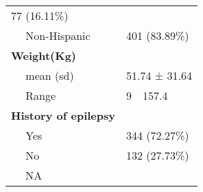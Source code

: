 \documentclass[
]{article}
\begin{document}
\begin{longtable}[]{@{}ll@{}}
\begin{minipage}[t]{0.21\columnwidth}
77 (16.11\%)\strut
\end{minipage}\tabularnewline
\begin{minipage}[t]{0.73\columnwidth}\raggedright
~~ Non-Hispanic\strut
\end{minipage} & \begin{minipage}[t]{0.21\columnwidth}\raggedright
401 (83.89\%)\strut
\end{minipage}\tabularnewline
\begin{minipage}[t]{0.73\columnwidth}\raggedright
\textbf{Weight(Kg)}\strut
\end{minipage} & \begin{minipage}[t]{0.21\columnwidth}\raggedright
~~\strut
\end{minipage}\tabularnewline
\begin{minipage}[t]{0.73\columnwidth}\raggedright
~~ mean (sd)\strut
\end{minipage} & \begin{minipage}[t]{0.21\columnwidth}\raggedright
51.74 ± 31.64\strut
\end{minipage}\tabularnewline
\begin{minipage}[t]{0.73\columnwidth}\raggedright
~~ Range\strut
\end{minipage} & \begin{minipage}[t]{0.21\columnwidth}\raggedright
9~~157.4\strut
\end{minipage}\tabularnewline
\begin{minipage}[t]{0.73\columnwidth}\raggedright
\textbf{History of epilepsy}\strut
\end{minipage} & \begin{minipage}[t]{0.21\columnwidth}\raggedright
~~\strut
\end{minipage}\tabularnewline
\begin{minipage}[t]{0.73\columnwidth}\raggedright
~~ Yes\strut
\end{minipage} & \begin{minipage}[t]{0.21\columnwidth}\raggedright
344 (72.27\%)\strut
\end{minipage}\tabularnewline
\begin{minipage}[t]{0.73\columnwidth}\raggedright
~~ No\strut
\end{minipage} & \begin{minipage}[t]{0.21\columnwidth}\raggedright
132 (27.73\%)\strut
\end{minipage}\tabularnewline
\begin{minipage}[t]{0.73\columnwidth}\raggedright
~~ NA\strut
\end{minipage} & \begin{minipage}[t]{0.21\columnwidth}\raggedright

\end{minipage}
\end{longtable}
\end{document}
